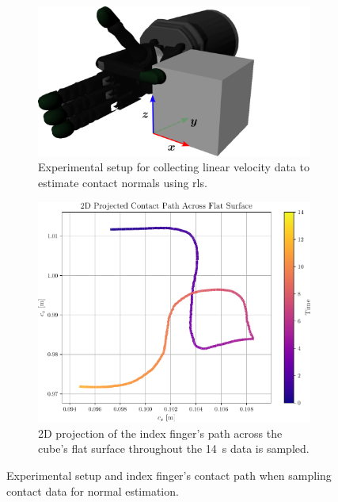 \begin{figure}[!h]
	\centering
	\begin{subfigure}[b]{0.48\textwidth}
		\centering
		\includegraphics[width=\textwidth]{chapters/1-tactile-perception/fig/inkscape/flat-contact-coor.pdf}
		\caption{Experimental setup for collecting linear velocity data to estimate contact normals using \gls{rls}.}
		\label{fig:flat-contact-coor}
	\end{subfigure}
	\hfill
	\begin{subfigure}[b]{0.48\textwidth}
		\centering
		\includegraphics[width=\textwidth]{chapters/1-tactile-perception/fig/matplotlib/2d-projected-contact-path-across-flat-surface.pdf}
		\caption{2D projection of the index finger's path across the cube's flat surface throughout the \SI{14}{\second} data is sampled.}
		\label{fig:2d-projected-contact-path-across-flat-surface}
	\end{subfigure}
		\caption{Experimental setup and index finger's contact path when sampling contact data for normal estimation.}
		\label{fig:experimental-setup-for-normal-estimation}
\end{figure}

